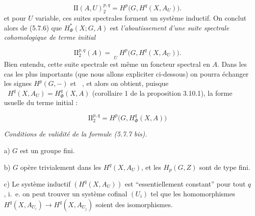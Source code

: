 \[
\mathrm {II}(A,U)_2^{p,q}=H^p\bigl(G,H^q(X,A_U)\bigr).
\]
et pour $U$ variable, ces suites spectrales forment un système inductif. On
conclut alors de (5.7.6) que $H_\Phi^*(X;G,A)$ est \textit{l'aboutissement
d'une suite spectrale cohomologique de terme initial}

\begin{equation}
\mathrm {II}_2^{p,q}(A)=\mathop{\underset{\to}{\lim.}}\limits_U H^p\bigl(G,H^q(X,A_U)\bigr).
\tag{5.7.7}
\end{equation}
Bien entendu, cette suite spectrale est même un foncteur spectral en $A$.
Dans les cas les plus importants (que nous allons expliciter ci-dessous) on
pourra échanger les signes $H^p(G,-)$ et $\mathop{\underset{\to}{\lim.}}$, et alors on obtient,
puisque $\mathop{\underset{\to}{\lim.}} H^q(X,A_U)=H_\Phi^q(X,A)$ (corollaire 1 de la proposition
3.10.1), la forme usuelle du terme initial :

\begin{equation}
\mathrm {II}_2^{p,q}=H^p\bigl(G,H_\Phi^q(X,A)\bigr)
\tag{5.7.7 bis}
\end{equation}

\noindent\textit{Conditions de validité de la formule \textup{(5.7.7 bis).}}

a) $G$ est un groupe fini.

b) $G$ opère trivialement dans les $H^q(X,A_U)$, et les
$H_p(G,Z)$ sont de type fini.

c) Le système inductif $(H^q(X,A_U))$ est
``essentiellement constant'' pour tout $q$, i.~e. on peut trouver un
système cofinal $(U_i)$ tel que les homomorphismes
$H^q(X,A_{U_i})\to H^q(X,A_{U_j})$ soient des isomorphismes.

